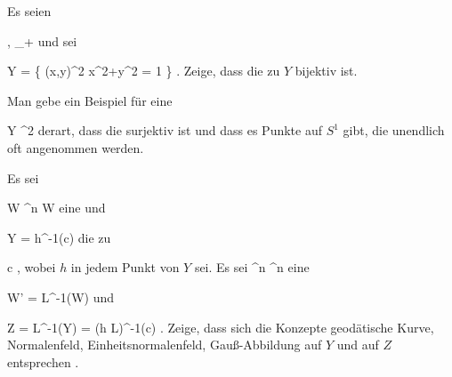 {}
{

Es seien

\mavergleichskette
{\vergleichskette
{ \alpha,\beta
}
{ \in }{ \R_+
}
{  }{
}
{    }{
}
{   }{
}
}
{}{}{}
und sei

\mavergleichskettedisp
{\vergleichskette
{ Y
}
{ =} { \left\{ (x,y)\in\R^2  \mid   \alpha x^2+\beta y^2 = 1        \right\}
}
{ } {
}
{ } {
}
{ } {
}
}
{}{}{.}
Zeige, dass die
zu $Y$ bijektiv ist.

}
{} {}

{}
{

Man gebe ein Beispiel für eine

\mavergleichskette
{\vergleichskette
{ Y
}
{ \subseteq }{ \R^2
}
{  }{
}
{    }{
}
{   }{
}
}
{}{}{}
derart, dass die
surjektiv ist und dass es Punkte auf $S^1$ gibt, die unendlich oft angenommen werden.

}
{} {}

{}
{

Es sei

\mavergleichskette
{\vergleichskette
{ W
}
{ \subseteq }{ \R^n
}
{  }{
}
{    }{
}
{   }{
}
}
{}{}{}
 { W } { \R
} {}
eine
und

\mavergleichskette
{\vergleichskette
{ Y
}
{ = }{ h^{-1}(c)
}
{  }{
}
{    }{
}
{   }{
}
}
{}{}{}
die
zu

\mavergleichskette
{\vergleichskette
{ c
}
{ \in }{ \R
}
{  }{
}
{    }{
}
{   }{
}
}
{}{}{,}
wobei $h$ in jedem Punkt von $Y$
sei. Es sei
 {\R^n } { \R^n
} {}
eine

\mavergleichskette
{\vergleichskette
{ W'
}
{ = }{ L^{-1}(W)
}
{  }{
}
{    }{
}
{   }{
}
}
{}{}{}
und

\mavergleichskettedisp
{\vergleichskette
{ Z
}
{ =} { L^{-1}(Y)
}
{ =} { (h \circ L)^{-1}(c)
}
{ } {
}
{ } {
}
}
{}{}{.}
Zeige, dass sich die Konzepte geodätische Kurve, Normalenfeld, Einheitsnormalenfeld, Gauß-Abbildung auf $Y$ und auf $Z$ entsprechen
 {} {.}

}
{} {}


